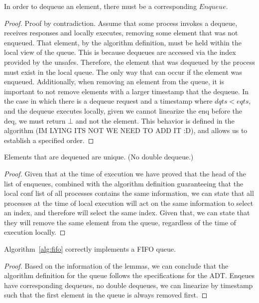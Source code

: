 \documentclass[a4paper,USenglish]{lipics-v2021} %
\begin{document}
\begin{lemma}
In order to dequeue an element, there must be a corresponding $Enqueue$.
\end{lemma}

\begin{proof}
Proof by contradiction. Assume that some process invokes a dequeue, receives responses and locally executes, removing some element that was not enqueued.  That element, by the algorithm definition, must be held within the local view of the queue. This is because dequeues are accessed via the index provided by the unsafes. Therefore, the element that was dequeued by the process must exist in the local queue. The only way that can occur if the element was enqueued.  Additionally, when removing an element from the queue, it is important to not remove elements with a larger timestamp that the dequeue. In the case in which there is a dequeue request and a timestamp where $dqts < eqts$, and the dequeue executes locally, given we cannot linearize the enq before the deq, we must return $\bot$ and not the element. This behavior is defined in the algorithm (IM LYING ITS NOT WE NEED TO ADD IT :D), and allows us to establish a specified order.
\end{proof}

\begin{lemma}
Elements that are dequeued are unique. (No double dequeue.)
\end{lemma}

\begin{proof}
Given that at the time of execution we have proved that the head of the list of enqueues, combined with the algorithm definition guaranteeing that the local conf list of all processes contains the same information, we can state that all processes at the time of local execution will act on the same information to select an index, and therefore will select the same index. Given that, we can state that they will remove the same element from the queue, regardless of the time of execution locally.
\end{proof}

\begin{theorem}
  Algorithm~\ref{alg:fifo} correctly implements a FIFO queue.
\end{theorem}

\begin{proof}
Based on the information of the lemmas, we can conclude that the algorithm definition for the queue follows the specifications for the ADT. Enqeues have corresponding dequeues, no double dequeues, we can linearize by timestamp such that the first element in the queue is always removed first.
\end{proof}
\end{document}
